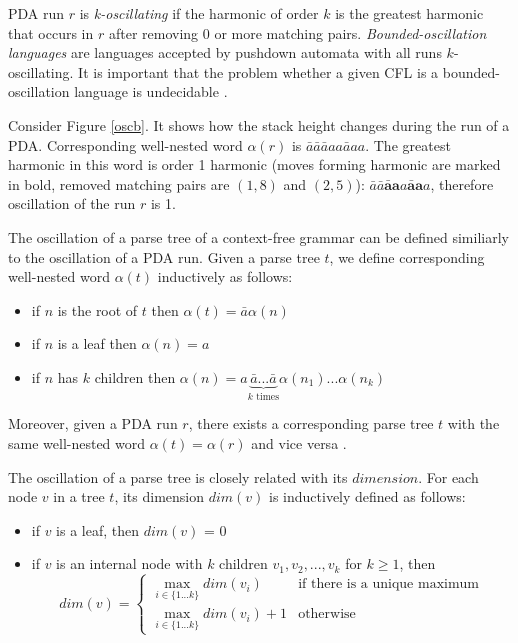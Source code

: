 PDA run $r$ is \textit{k-oscillating} if the harmonic of order $k$ is the greatest harmonic that occurs in $r$ after removing $0$ or more matching pairs. \textit{Bounded-oscillation languages} are languages accepted by pushdown automata with all runs $k$-oscillating. It is important that the problem whether a given CFL is a bounded-oscillation language is undecidable \cite{BoundOsc}.
\begin{example}
Consider Figure \ref{oscb}. It shows how the stack height changes during the run of a PDA. Corresponding well-nested word $\alpha(r)$ is $\bar{a}\bar{a}\bar{a}aa\bar{a}aa$. The greatest harmonic in this word is order 1 harmonic (moves forming harmonic are marked in bold, removed matching pairs are $(1, 8)$ and $(2, 5)$): $\bar{a}\bar{a}\mathbf{\bar{a}a}a\mathbf{\bar{a}a}a$, therefore oscillation of the run $r$ is 1.
\end{example}


The oscillation of a parse tree of a context-free grammar can be defined similiarly to the oscillation of a PDA run. Given a parse tree $t$, we define corresponding well-nested word $\alpha(t)$ inductively as follows:
\begin{itemize}
\item if $n$ is the root of $t$ then $\alpha(t) = \bar{a}\alpha(n)$
\item if $n$ is a leaf then $\alpha(n)=a$
\item if $n$ has $k$ children then $\alpha(n) = a\underbrace{\bar{a}...\bar{a}}_\text{$k$ times}\alpha(n_1)...\alpha(n_k)$
\end{itemize}


Moreover, given a PDA run $r$, there exists a corresponding parse tree $t$ with the same well-nested word $\alpha(t)=\alpha(r)$ and vice versa \cite{BoundOsc}.


The oscillation of a parse tree is closely related with its $dimension$. For each node $v$ in a tree $t$, its dimension $dim(v)$ is inductively defined as follows:
\begin{itemize}
\item if $v$ is a leaf, then $dim(v)$ = 0
\item if $v$ is an internal node with $k$ children $v_1, v_2, ..., v_k$ for $k \ge 1$, then 
$$
dim(v) = 
 \begin{cases}
   \max_{i \in \{1...k\}}dim(v_i) &\text{if there is a unique maximum}\\
   \max_{i \in \{1...k\}}dim(v_i)+1 &\text{otherwise}
 \end{cases}
$$
\end{itemize}


